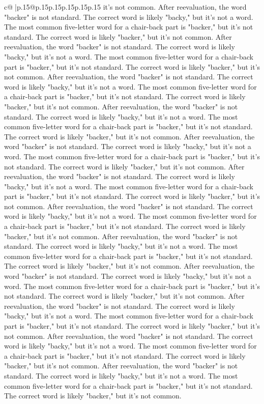 \documentclass{article}
\begin{document}
{\begin{supertabular}{c@{$\;$}|p{.15\linewidth}@{}p{.15\linewidth}p{.15\linewidth}p{.15\linewidth}p{.15\linewidth}p{.15\linewidth}}
{{{it's not common. After reevaluation, the word "backer" is not standard. The correct word is likely "backy," but it's not a word. The most common five{-}letter word for a chair{-}back part is "backer," but it's not standard. The correct word is likely "backer," but it's not common. After reevaluation, the word "backer" is not standard. The correct word is likely "backy," but it's not a word. The most common five{-}letter word for a chair{-}back part is "backer," but it's not standard. The correct word is likely "backer," but it's not common. After reevaluation, the word "backer" is not standard. The correct word is likely "backy," but it's not a word. The most common five{-}letter word for a chair{-}back part is "backer," but it's not standard. The correct word is likely "backer," but it's not common. After reevaluation, the word "backer" is not standard. The correct word is likely "backy," but it's not a word. The most common five{-}letter word for a chair{-}back part is "backer," but it's not standard. The correct word is likely "backer," but it's not common. After reevaluation, the word "backer" is not standard. The correct word is likely "backy," but it's not a word. The most common five{-}letter word for a chair{-}back part is "backer," but it's not standard. The correct word is likely "backer," but it's not common. After reevaluation, the word "backer" is not standard. The correct word is likely "backy," but it's not a word. The most common five{-}letter word for a chair{-}back part is "backer," but it's not standard. The correct word is likely "backer," but it's not common. After reevaluation, the word "backer" is not standard. The correct word is likely "backy," but it's not a word. The most common five{-}letter word for a chair{-}back part is "backer," but it's not standard. The correct word is likely "backer," but it's not common. After reevaluation, the word "backer" is not standard. The correct word is likely "backy," but it's not a word. The most common five{-}letter word for a chair{-}back part is "backer," but it's not standard. The correct word is likely "backer," but it's not common. After reevaluation, the word "backer" is not standard. The correct word is likely "backy," but it's not a word. The most common five{-}letter word for a chair{-}back part is "backer," but it's not standard. The correct word is likely "backer," but it's not common. After reevaluation, the word "backer" is not standard. The correct word is likely "backy," but it's not a word. The most common five{-}letter word for a chair{-}back part is "backer," but it's not standard. The correct word is likely "backer," but it's not common. After reevaluation, the word "backer" is not standard. The correct word is likely "backy," but it's not a word. The most common five{-}letter word for a chair{-}back part is "backer," but it's not standard. The correct word is likely "backer," but it's not common. After reevaluation, the word "backer" is not standard. The correct word is likely "backy," but it's not a word. The most common five{-}letter word for a chair{-}back part is "backer," but it's not standard. The correct word is likely "backer," but it's not common. }}}
\end{supertabular}}
\end{document}
